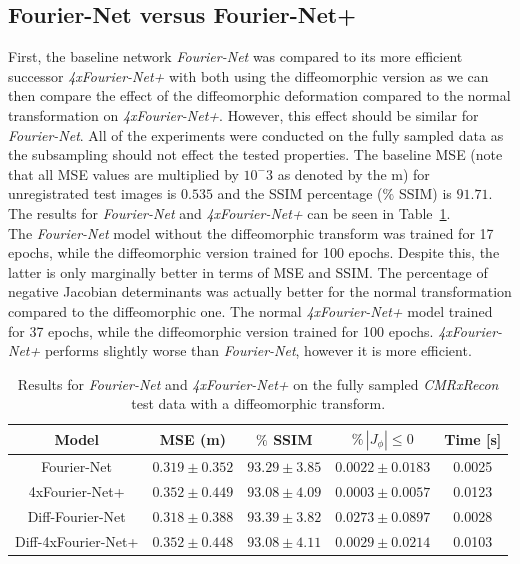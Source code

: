 \documentclass[english,version-2022-01]{uzl-thesis} %
\begin{document}
\subsection{Fourier-Net versus Fourier-Net+} \label{SubSec:ResultsFourier-NetvsFourier-Net+CMRxRecon}
First, the baseline network \emph{Fourier-Net} was compared to its more efficient successor \emph{4xFourier-Net+} with both using the diffeomorphic version as we can then compare the effect of the diffeomorphic deformation compared to the normal transformation on \emph{4xFourier-Net+}. However, this effect should be similar for \emph{Fourier-Net}. All of the experiments were conducted on the fully sampled data as the subsampling should not effect the tested properties. The baseline MSE (note that all MSE values are multiplied by $10^-3$ as denoted by the m) for unregistrated test images is $0.535$ and the SSIM percentage ($\%$ SSIM) is $91.71$. The results for \emph{Fourier-Net} and \emph{4xFourier-Net+} can be seen in Table~\ref{tab:Fourier-NetvsFourier-Net+CMRxRecon}. \\
The \emph{Fourier-Net} model without the diffeomorphic transform was trained for 17 epochs, while the diffeomorphic version trained for 100 epochs. Despite this, the latter is only marginally better in terms of MSE and SSIM. The percentage of negative Jacobian determinants was actually better for the normal transformation compared to the diffeomorphic one. The normal \emph{4xFourier-Net+} model trained for 37 epochs, while the diffeomorphic version trained for 100 epochs. \emph{4xFourier-Net+} performs slightly worse than \emph{Fourier-Net}, however it is more efficient.


\begin{table}[htpb]
	\centering
	\caption{Results for \emph{Fourier-Net} and \emph{4xFourier-Net+} on the fully sampled \emph{CMRxRecon} test data with a diffeomorphic transform.}
	\label{tab:Fourier-NetvsFourier-Net+CMRxRecon}
	\begin{tabular}{c c c c c} %
		\toprule
		Model & MSE (m) & $\%$ SSIM & $\% \, |J_{\phi}|\leq0$ & Time [s] \\
		\midrule
		Fourier-Net & $0.319 \pm 0.352$ &  $93.29 \pm 3.85$ & $0.0022 \pm 0.0183$ & 0.0025\\ 
		4xFourier-Net+ & $0.352 \pm 0.449$ & $93.08 \pm 4.09$ & $0.0003 \pm 0.0057$ & 0.0123\\ 
		\midrule
		Diff-Fourier-Net & $0.318 \pm 0.388$ &  $93.39 \pm 3.82$ & $0.0273 \pm 0.0897$ & 0.0028\\ 
		Diff-4xFourier-Net+ & $0.352 \pm 0.448$ & $93.08 \pm 4.11$ & $0.0029 \pm 0.0214$ & 0.0103\\  
		\bottomrule
	\end{tabular}
\end{table}
\end{document}
